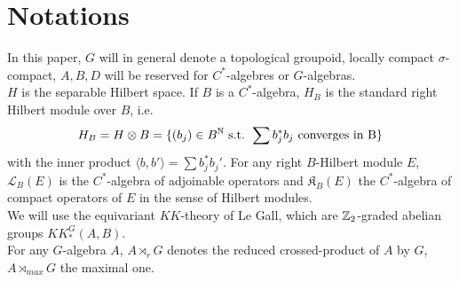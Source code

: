 \section{Notations}

In this paper, $G$ will in general denote a topological groupoid, locally compact $\sigma$-compact, $A,B,D$ will be reserved for $C^*$-algebres or $G$-algebras.\\

$H$ is the separable Hilbert space. If $B$ is a $C^*$-algebra, $H_B$ is the standard right Hilbert module over $B$, i.e. \[H_B= H\otimes B=\{(b_j)\in B^\mathbb N \text{ s.t. }\sum b_j^* b_j \text{ converges in B}\}\] with the inner product $\langle b, b'\rangle = \sum b_j^* b_j'$. For any right $B$-Hilbert module $E$, $\mathcal L_B(E)$ is the $C^*$-algebra of adjoinable operators and $\mathfrak K_B(E)$ the $C^*$-algebra of compact operators of $E$ in the sense of Hilbert modules.\\

We will use the equivariant $KK$-theory of Le Gall, which are $\mathbb Z_2$-graded abelian groups $KK^G_*(A,B)$.\\

For any $G$-algebra $A$, $A\rtimes_r G$ denotes the reduced crossed-product of $A$ by $G$, $A\rtimes_{max} G$ the maximal one. 
